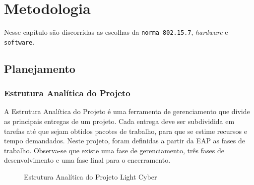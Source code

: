 	\chapter{Metodologia}\label{cap-metodologia}
	
	Nesse capítulo são discorridas as escolhas da \texttt{norma 802.15.7}, \textit{hardware} e \texttt{software}.
	
	\section{Planejamento}\label{sec-planejamento}
	
	\subsection{Estrutura Analítica do Projeto}\label{subsec-eap}
	
	A Estrutura Analítica do Projeto é uma ferramenta de gerenciamento que divide as principais entregas de um projeto. Cada entrega deve ser subdividida em tarefas até que sejam obtidos pacotes de trabalho, para que se estime recursos e tempo demandados. Neste projeto, foram definidas a partir da EAP as fases de trabalho. Observa-se que existe uma fase de gerenciamento, três fases de desenvolvimento e uma fase final para o encerramento.
	
	\begin{figure}[h!]
		\caption{\label{fig_eap} Estrutura Analítica do Projeto Light Cyber }
		\centering
	\end{figure}
	

